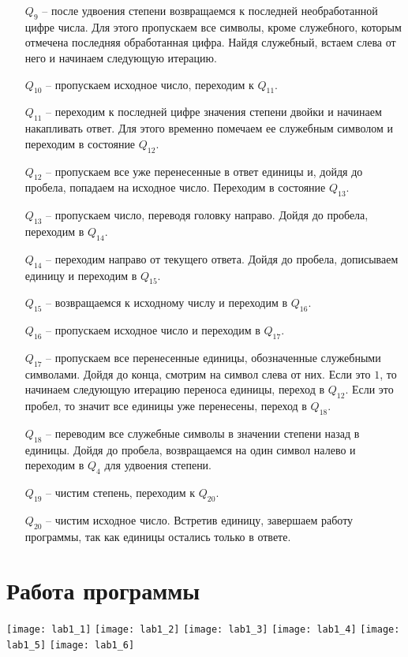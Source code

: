 \begin{itemize}
        \item[$Q_9$] -- после удвоения степени возвращаемся к последней необработанной цифре числа.
        Для этого пропускаем все символы, кроме служебного, которым отмечена последняя обработанная цифра.
        Найдя служебный, встаем слева от него и начинаем следующую итерацию.
        \item[$Q_{10}$] -- пропускаем исходное число, переходим к $Q_{11}$.
        \item[$Q_{11}$] -- переходим к последней цифре значения степени двойки и начинаем накапливать ответ.
        Для этого временно помечаем ее служебным символом и переходим в состояние $Q_{12}$.
        \item[$Q_{12}$] -- пропускаем все уже перенесенные в ответ единицы и, дойдя до пробела, попадаем на исходное число.
        Переходим в состояние $Q_{13}$.
        \item[$Q_{13}$] -- пропускаем число, переводя головку направо.
        Дойдя до пробела, переходим в $Q_{14}$.
        \item[$Q_{14}$] -- переходим направо от текущего ответа.
        Дойдя до пробела, дописываем единицу и переходим в $Q_{15}$.
        \item[$Q_{15}$] -- возвращаемся к исходному числу и переходим в $Q_{16}$.
        \item[$Q_{16}$] -- пропускаем исходное число и переходим в $Q_{17}$.
        \item[$Q_{17}$] -- пропускаем все перенесенные единицы, обозначенные служебными символами.
        Дойдя до конца, смотрим на символ слева от них.
        Если это $1$, то начинаем следующую итерацию переноса единицы, переход в $Q_{12}$.
        Если это пробел, то значит все единицы уже перенесены, переход в $Q_{18}$.
        \item[$Q_{18}$] -- переводим все служебные символы в значении степени назад в единицы.
        Дойдя до пробела, возвращаемся на один символ налево и переходим в $Q_4$ для удвоения степени.
        \item[$Q_{19}$] -- чистим степень, переходим к $Q_{20}$.
        \item[$Q_{20}$] -- чистим исходное число.
        Встретив единицу, завершаем работу программы, так как единицы остались только в ответе.
    \end{itemize}

    \newpage

    \section{Работа программы}

    \begin{center}
        \texttt{[image: lab1\_1]}
        \texttt{[image: lab1\_2]}
        \texttt{[image: lab1\_3]}
        \texttt{[image: lab1\_4]}
        \texttt{[image: lab1\_5]}
        \texttt{[image: lab1\_6]}
    \end{center}

